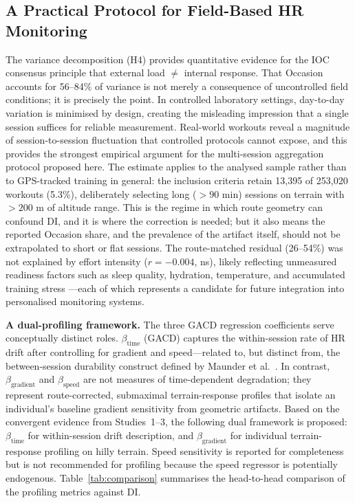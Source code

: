 \documentclass[times, twoside]{zHenriquesLab-StyleBioRxiv}
\begin{document}
\subsection*{A Practical Protocol for Field-Based HR Monitoring}

The variance decomposition (H4) provides quantitative evidence for the IOC consensus \cite{bourdon2017} principle that external load $\neq$ internal response. That Occasion accounts for 56--84\% of variance is not merely a consequence of uncontrolled field conditions; it is precisely the point. In controlled laboratory settings, day-to-day variation is minimised by design, creating the misleading impression that a single session suffices for reliable measurement. Real-world workouts reveal a magnitude of session-to-session fluctuation that controlled protocols cannot expose, and this provides the strongest empirical argument for the multi-session aggregation protocol proposed here. The estimate applies to the analysed sample rather than to GPS-tracked training in general: the inclusion criteria retain 13{,}395 of 253{,}020 workouts (5.3\%), deliberately selecting long ($>90$ min) sessions on terrain with $>200$ m of altitude range. This is the regime in which route geometry can confound DI, and it is where the correction is needed; but it also means the reported Occasion share, and the prevalence of the artifact itself, should not be extrapolated to short or flat sessions. The route-matched residual (26--54\%) was not explained by effort intensity ($r = -0.004$, ns), likely reflecting unmeasured readiness factors such as sleep quality, hydration, temperature, and accumulated training stress \cite{halson2014}---each of which represents a candidate for future integration into personalised monitoring systems.

\textbf{A dual-profiling framework.} The three GACD regression coefficients serve conceptually distinct roles. $\beta_{\text{time}}$ (GACD) captures the within-session rate of HR drift after controlling for gradient and speed---related to, but distinct from, the between-session durability construct defined by Maunder et al.\ \cite{maunder2021}. In contrast, $\beta_{\text{gradient}}$ and $\beta_{\text{speed}}$ are not measures of time-dependent degradation; they represent route-corrected, submaximal terrain-response profiles that isolate an individual's baseline gradient sensitivity from geometric artifacts. Based on the convergent evidence from Studies~1--3, the following dual framework is proposed: $\beta_{\text{time}}$ for within-session drift description, and $\beta_{\text{gradient}}$ for individual terrain-response profiling on hilly terrain. Speed sensitivity is reported for completeness but is not recommended for profiling because the speed regressor is potentially endogenous. Table~\ref{tab:comparison} summarises the head-to-head comparison of the profiling metrics against DI.
\end{document}
